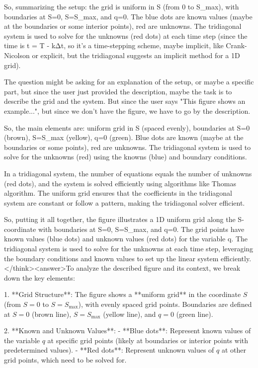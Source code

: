 So, summarizing the setup: the grid is uniform in S (from 0 to S_max), with boundaries at S=0, S=S_max, and q=0. The blue dots are known values (maybe at the boundaries or some interior points), red are unknowns. The tridiagonal system is used to solve for the unknowns (red dots) at each time step (since the time is t = T - kΔt, so it's a time-stepping scheme, maybe implicit, like Crank-Nicolson or explicit, but the tridiagonal suggests an implicit method for a 1D grid).

The question might be asking for an explanation of the setup, or maybe a specific part, but since the user just provided the description, maybe the task is to describe the grid and the system. But since the user says "This figure shows an example...", but since we don't have the figure, we have to go by the description.

So, the main elements are: uniform grid in S (spaced evenly), boundaries at S=0 (brown), S=S_max (yellow), q=0 (green). Blue dots are known (maybe at the boundaries or some points), red are unknowns. The tridiagonal system is used to solve for the unknowns (red) using the knowns (blue) and boundary conditions.

In a tridiagonal system, the number of equations equals the number of unknowns (red dots), and the system is solved efficiently using algorithms like Thomas algorithm. The uniform grid ensures that the coefficients in the tridiagonal system are constant or follow a pattern, making the tridiagonal solver efficient.

So, putting it all together, the figure illustrates a 1D uniform grid along the S-coordinate with boundaries at S=0, S=S_max, and q=0. The grid points have known values (blue dots) and unknown values (red dots) for the variable q. The tridiagonal system is used to solve for the unknowns at each time step, leveraging the boundary conditions and known values to set up the linear system efficiently.</think><answer>To analyze the described figure and its context, we break down the key elements:  

1. **Grid Structure**: The figure shows a **uniform grid** in the coordinate \( S \) (from \( S=0 \) to \( S=S_{\text{max}} \)), with evenly spaced grid points. Boundaries are defined at \( S=0 \) (brown line), \( S=S_{\text{max}} \) (yellow line), and \( q=0 \) (green line).  

2. **Known and Unknown Values**:  
   - **Blue dots**: Represent known values of the variable \( q \) at specific grid points (likely at boundaries or interior points with predetermined values).  
   - **Red dots**: Represent unknown values of \( q \) at other grid points, which need to be solved for.  

